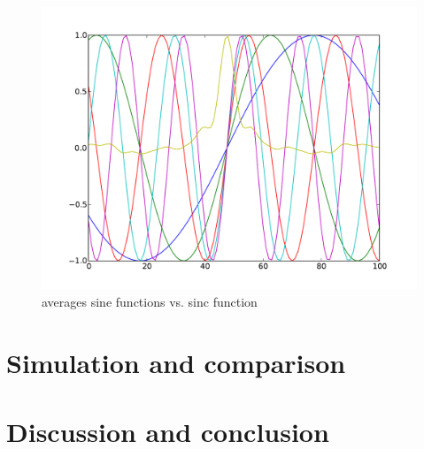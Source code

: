 \begin{figure}
\begin{minipage}{0.38\linewidth}\includegraphics[width=1\textwidth]{./Figures/amplitude_phase.pdf}\caption{averages sine 
functions vs. sinc function}\label{fig:amplitude_phase}
\end{minipage}
\end{figure}
\section{Simulation and comparison}
\section{Discussion and conclusion}